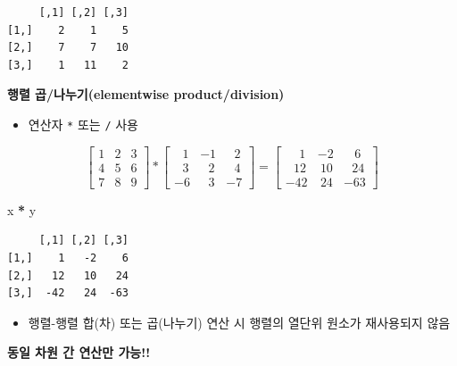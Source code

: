 \documentclass[
  11pt,
]{krantz}
\makeatletter
\newenvironment{Shaded}{\begin{snugshade}}{\end{snugshade}}
\newcommand{\NormalTok}[1]{#1}
\newcommand{\OperatorTok}[1]{\textcolor[rgb]{0.43,0.43,0.43}{\textbf{#1}}}
\newcommand{\StringTok}[1]{\textcolor[rgb]{0.5,0.5,0.5}{#1}}
\providecommand{\tightlist}{%
  \setlength{\itemsep}{0pt}\setlength{\parskip}{0pt}}
\newenvironment{kframe}{%
\medskip{}
\setlength{\fboxsep}{.8em}
 \def\at@end@of@kframe{}%
 \ifinner\ifhmode%
  \def\at@end@of@kframe{\end{minipage}}%
  \begin{minipage}{\columnwidth}%
 \fi\fi%
 \def\FrameCommand##1{\hskip\@totalleftmargin \hskip-\fboxsep
 \colorbox{shadecolor}{##1}\hskip-\fboxsep
     \hskip-\linewidth \hskip-\@totalleftmargin \hskip\columnwidth}%
 \MakeFramed {\advance\hsize-\width
   \@totalleftmargin\z@ \linewidth\hsize
   \@setminipage}}%
 {\par\unskip\endMakeFramed%
 \at@end@of@kframe}
\renewenvironment{quote}{\begin{kframe}}{\end{kframe}}
\makeatother
\begin{document}
\begin{verbatim}
     [,1] [,2] [,3]
[1,]    2    1    5
[2,]    7    7   10
[3,]    1   11    2
\end{verbatim}

\normalsize

\textbf{행렬 곱/나누기(elementwise product/division)}

\begin{itemize}
\tightlist
\item
  연산자 \texttt{*} 또는 \texttt{/} 사용
\end{itemize}

\[\begin{bmatrix}
1 & 2 & 3 \\
4 & 5 & 6 \\ 
7 & 8 & 9
\end{bmatrix} *  
\begin{bmatrix}
~~~1 & -1 &  ~~~2 \\
~~~3 & ~~~2 & ~~~4 \\ 
-6 & ~~~3 & -7
\end{bmatrix} 
 = 
\begin{bmatrix}
~~~~~ 1  & -2  &  ~~~~6 \\
~~~  12  & ~10 &  ~~~24 \\ 
    -42  & ~24 & -63
\end{bmatrix}
\]

\footnotesize

\begin{Shaded}
\begin{Highlighting}[]
\NormalTok{x }\OperatorTok{*}\StringTok{ }\NormalTok{y}
\end{Highlighting}
\end{Shaded}

\begin{verbatim}
     [,1] [,2] [,3]
[1,]    1   -2    6
[2,]   12   10   24
[3,]  -42   24  -63
\end{verbatim}

\normalsize

\begin{itemize}
\tightlist
\item
  행렬-행렬 합(차) 또는 곱(나누기) 연산 시 행렬의 열단위 원소가 재사용되지 않음
\end{itemize}

\begin{quote}
\textbf{동일 차원 간 연산만 가능!!}
\end{quote}

\footnotesize
\end{document}
